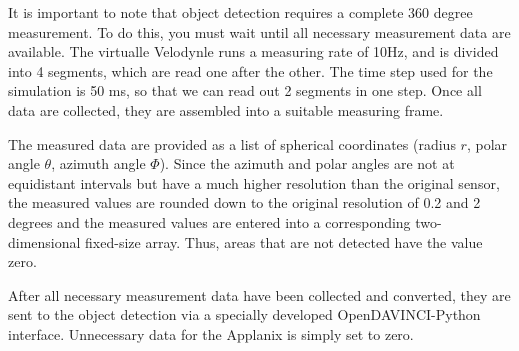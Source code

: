 \documentclass[11pt,oneside,openright]{mpreport}
\begin{document}
It is important to note that object detection requires a complete 360 degree measurement. To do this, you must wait until all necessary measurement data are available.
The virtualle Velodynle runs a measuring rate of 10Hz, and is divided into 4 segments, which are read one after the other. 
The time step used for the simulation is 50 ms, so that we can read out 2 segments in one step. Once all data are collected, they are assembled into a suitable measuring frame.


The measured data are provided as a list of spherical coordinates (radius $r$, polar angle $\theta $, azimuth angle $\Phi$).
Since the azimuth and polar angles are not at equidistant intervals but have a much higher resolution than the original sensor,
the measured values are rounded down to the original resolution of 0.2 and 2 degrees and the measured values are entered into a corresponding two-dimensional fixed-size array.
Thus, areas that are not detected have the value zero.

After all necessary measurement data have been collected and converted, they are sent to the object detection via a specially developed OpenDAVINCI-Python interface.
Unnecessary data for the Applanix is simply set to zero.
\end{document}
